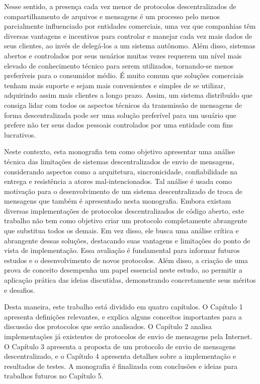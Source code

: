 Nesse sentido, a presença cada vez menor de protocolos descentralizados de compartilhamento de arquivos e mensagens é um processo pelo menos parcialmente influenciado por entidades comerciais, uma vez que companhias têm diversas vantagens e incentivos para controlar e manejar cada vez mais dados de seus clientes, ao invés de delegá-los a um sistema autônomo. Além disso, sistemas abertos e controlados por seus usuários muitas vezes requerem um nível mais elevado de conhecimento técnico para serem utilizados, tornando-se menos preferíveis para o consumidor médio. É muito comum que soluções comerciais tenham mais suporte e sejam mais convenientes e simples de se utilizar, adquirindo assim mais clientes a longo prazo. Assim, um sistema distribuído que consiga lidar com todos os aspectos técnicos da transmissão de mensagens de forma descentralizada pode ser uma solução preferível para um usuário que prefere não ter seus dados pessoais controlados por uma entidade com fins lucrativos. 

Neste contexto, esta monografia tem como objetivo apresentar uma análise técnica das limitações de sistemas descentralizados de envio de mensagens, considerando aspectos como a arquitetura, sincronicidade, confiabilidade na entrega e resistência a atores mal-intencionados. Tal análise é usada como motivação para o desenvolvimento de um sistema descentralizado de troca de mensagens que também é apresentado nesta monografia. Embora existam diversas implementações de protocolos descentralizados de código aberto, este trabalho não tem como objetivo criar um protocolo completamente abrangente que substitua todos os demais. Em vez disso, ele busca uma análise crítica e abrangente dessas soluções, destacando suas vantagens e limitações do ponto de vista de implementação. Essa avaliação é fundamental para informar futuros estudos e o desenvolvimento de novos protocolos. Além disso, a criação de uma prova de conceito desempenha um papel essencial neste estudo, ao permitir a aplicação prática das ideias discutidas, demonstrando concretamente seus méritos e desafios.

Desta maneira, este trabalho está dividido em quatro capítulos. O Capítulo 1 apresenta definições relevantes, e explica alguns conceitos importantes para a discussão dos protocolos que serão analisados. O Capítulo 2 analisa implementações já existentes de protocolos de envio de mensagens pela Internet. O Capítulo 3 apresenta a proposta de um protocolo de envio de mensagens descentralizado, e o Capítulo 4 apresenta detalhes sobre a implementação e resultados de testes. A monografia é finalizada com conclusões e ideias para trabalhos futuros no Capítulo 5.